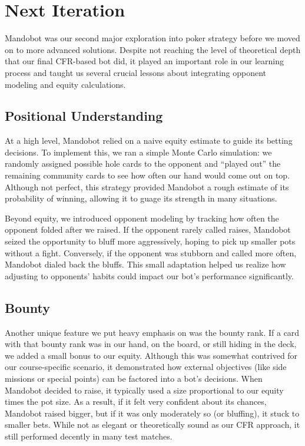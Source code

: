 \documentclass{article}
\begin{document}
    \section*{Next Iteration}

    Mandobot was our second major exploration into poker strategy before we moved on to more advanced solutions. Despite not reaching the level of theoretical depth that our final CFR-based bot did, it played an important role in our learning process and taught us several crucial lessons about integrating opponent modeling and equity calculations.
    
    \subsection*{Positional Understanding}
    
    At a high level, Mandobot relied on a naive equity estimate to guide its betting decisions. To implement this, we ran a simple Monte Carlo simulation: we randomly assigned possible hole cards to the opponent and “played out” the remaining community cards to see how often our hand would come out on top. Although not perfect, this strategy provided Mandobot a rough estimate of its probability of winning, allowing it to guage its strength in many situations.

    Beyond equity, we introduced opponent modeling by tracking how often the opponent folded after we raised. If the opponent rarely called raises, Mandobot seized the opportunity to bluff more aggressively, hoping to pick up smaller pots without a fight. Conversely, if the opponent was stubborn and called more often, Mandobot dialed back the bluffs. This small adaptation helped us realize how adjusting to opponents’ habits could impact our bot’s performance significantly.

    \subsection*{Bounty}

    Another unique feature we put heavy emphasis on was the bounty rank. If a card with that bounty rank was in our hand, on the board, or still hiding in the deck, we added a small bonus to our equity. Although this was somewhat contrived for our course-specific scenario, it demonstrated how external objectives (like side missions or special points) can be factored into a bot’s decisions. When Mandobot decided to raise, it typically used a size proportional to our equity times the pot size. As a result, if it felt very confident about its chances, Mandobot raised bigger, but if it was only moderately so (or bluffing), it stuck to smaller bets. While not as elegant or theoretically sound as our CFR approach, it still performed decently in many test matches.
\end{document}
